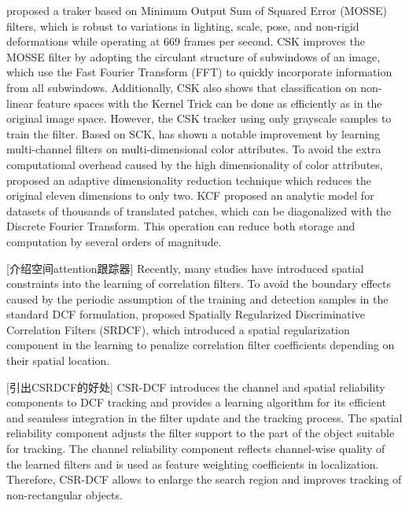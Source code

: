 \documentclass[review]{elsarticle}
\begin{document}
\begin{CJK*}{UTF8}{gbsn}
\cite{Bolme2010VisualOT} proposed a traker based on Minimum Output Sum of Squared Error (MOSSE) filters, which is robust to variations in lighting, scale, pose, and non-rigid deformations while operating at 669 frames per second.
CSK \cite{Henriques2012ExploitingTC} improves the MOSSE filter by adopting the circulant structure of subwindows of an image, which use the Fast Fourier Transform (FFT) to quickly incorporate information from all subwindows. Additionally, CSK also shows that classification on non-linear feature spaces with the Kernel Trick can be done as efficiently as in the original image space. However, the CSK tracker using only grayscale samples to train the filter.
Based on SCK, \cite{Danelljan2014AdaptiveCA} has shown a notable improvement by learning multi-channel filters on multi-dimensional color attributes. To avoid the extra computational overhead caused by the high dimensionality of color attributes, \cite{Danelljan2014AdaptiveCA} proposed an adaptive dimensionality reduction technique which reduces the original eleven dimensions to only two.
KCF \cite{Henriques2015HighSpeedTW} proposed an analytic model for datasets of thousands of translated patches, which can be diagonalized with the Discrete Fourier Transform. This operation can reduce both storage and computation by several orders of magnitude.

[介绍空间attention跟踪器] Recently, many studies \cite{Danelljan2015LearningSR, Lukezic2017DiscriminativeCF} have introduced spatial constraints into the learning of correlation filters.
To avoid the boundary effects caused by the periodic assumption of the training and detection samples in the standard DCF formulation, \cite{Danelljan2015LearningSR} proposed Spatially Regularized Discriminative Correlation Filters (SRDCF), which introduced a spatial regularization component in the learning to penalize correlation filter coefficients depending on their spatial location.

[引出CSRDCF的好处] CSR-DCF \cite{Lukezic2017DiscriminativeCF} introduces the channel and spatial reliability components to DCF tracking and provides a learning algorithm for its efficient and seamless integration in the filter update and the tracking process. The spatial reliability component adjusts the filter support to the part of the object suitable for tracking. The channel reliability component reflects channel-wise quality of the learned filters and is used as feature weighting coefficients in localization. Therefore, CSR-DCF allows to enlarge the search region and improves tracking of non-rectangular objects.


\end{CJK*}
\end{document}
